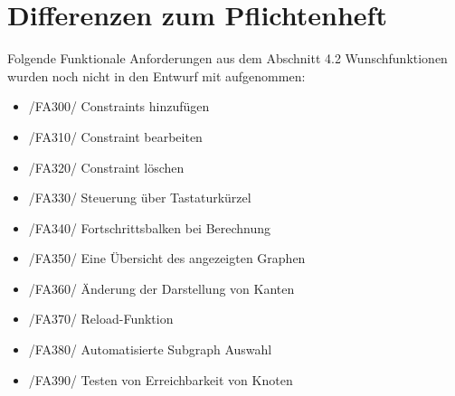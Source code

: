 \chapter{Differenzen zum Pflichtenheft}

Folgende Funktionale Anforderungen aus dem Abschnitt 4.2 Wunschfunktionen wurden noch nicht in den Entwurf mit aufgenommen:
\begin{itemize}
	\item /FA300/ Constraints hinzufügen
	\item /FA310/ Constraint bearbeiten
	\item /FA320/ Constraint löschen
	\item /FA330/ Steuerung über Tastaturkürzel
	\item /FA340/ Fortschrittsbalken bei Berechnung
	\item /FA350/ Eine Übersicht des angezeigten Graphen
	\item /FA360/ Änderung der Darstellung von Kanten
	\item /FA370/ Reload-Funktion
	\item /FA380/ Automatisierte Subgraph Auswahl
	\item /FA390/ Testen von Erreichbarkeit von Knoten
\end{itemize}
